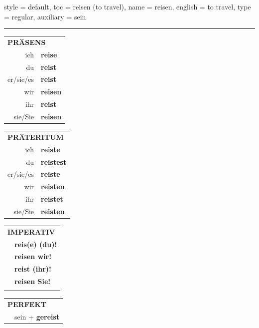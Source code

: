 \begin{verbentry}{
  style = {default},
  toc = {reisen (to travel)},
  name = {reisen},
  english = {to travel},
  type = {regular},
  auxiliary = {sein}
}
 
    
     \vspace{5pt}

    \hrule
    
    \vspace{5pt}

  \begin{tabular}{rl}
     \multicolumn{2}{l}{\textbf{PRÄSENS} }\\
    ich & \textbf{reise}\\
    du & \textbf{reist}\\
    er/sie/es & \textbf{reist}\\
    wir & \textbf{reisen}\\
    ihr & \textbf{reist}\\
    sie/Sie & \textbf{reisen}\\
  \end{tabular}
  \hfill
     \begin{tabular}{rl}
    \multicolumn{2}{l}{\textbf{PRÄTERITUM} }\\
    ich & \textbf{reiste}\\
    du & \textbf{reistest}\\
    er/sie/es & \textbf{reiste}\\
    wir & \textbf{reisten}\\
    ihr & \textbf{reistet}\\
    sie/Sie & \textbf{reisten}\\
  \end{tabular}
  \hfill
  \begin{tabular}{rl}
     \multicolumn{2}{l}{\textbf{IMPERATIV} }\\
   & \textbf{reis(e) (du)!}\\
   & \textbf{reisen wir!}\\
   & \textbf{reist (ihr)!}\\
   & \textbf{reisen Sie!}\\
   & \vspace{10pt}
  \end{tabular}

    \vspace{10pt}

 \begin{tabular}{rl}
     \multicolumn{2}{l}{\textbf{PERFEKT}}\\
   & sein + \textbf{gereist}\\
  \end{tabular}
\hfill
   \begin{tabular}{rl}
   

\end{tabular}
\end{verbentry}
